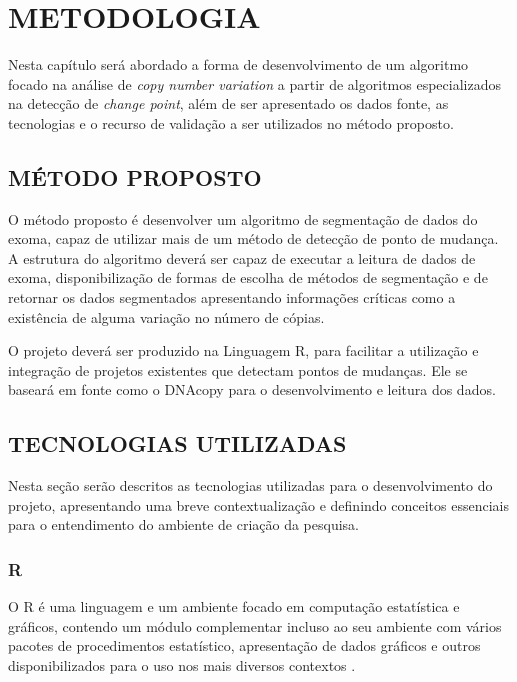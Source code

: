 
\chapter{METODOLOGIA}
\label{chap:metodologia}
Nesta capítulo será abordado a forma de desenvolvimento de um algoritmo focado na análise de \textit{copy number variation} a partir de algoritmos especializados na detecção de \textit{change point}, além de ser apresentado os dados fonte, as tecnologias e o recurso de validação a ser utilizados no método proposto. 

\section{MÉTODO PROPOSTO} 

O método proposto é desenvolver um algoritmo de segmentação de dados do exoma, capaz de utilizar mais de um método de detecção de ponto de mudança. A estrutura do algoritmo deverá ser capaz de executar a leitura de dados de exoma, disponibilização de formas de escolha de métodos de segmentação e de retornar os dados segmentados apresentando informações críticas como a existência de alguma variação no número de cópias.

O projeto deverá ser produzido na Linguagem R, para facilitar a utilização e integração de projetos existentes que detectam pontos de mudanças. Ele se baseará em fonte como o DNAcopy \cite{Olshen2004} para o desenvolvimento e leitura dos dados.

\section{TECNOLOGIAS UTILIZADAS}

Nesta seção serão descritos as tecnologias utilizadas para o desenvolvimento do projeto, apresentando uma breve contextualização e definindo conceitos essenciais para o entendimento do ambiente de criação da pesquisa.

\subsection{R}

O R \cite{Core2019} é uma linguagem e um ambiente focado em computação estatística e gráficos, contendo um módulo complementar incluso ao seu ambiente com vários pacotes de procedimentos estatístico, apresentação de dados gráficos e outros disponibilizados para o uso nos mais diversos contextos \cite{website:Hornik2018}.

